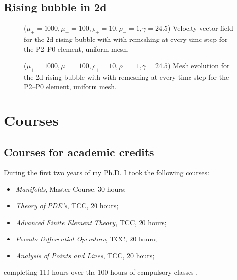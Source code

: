 \documentclass[a4paper,11pt,onecolumn]{article}
\begin{document}
\subsection{Rising bubble in 2d}

\begin{figure}[htbp]
\centering
{}
\caption{($\mu_+ = 1000,\mu_- = 100,\rho_+=10,\rho_-=1,\gamma = 24.5$)
Velocity vector field for the 2d rising bubble with with remeshing at every
time step for the P2--P0 element, uniform mesh.}
\label{fig:rising_bubble_2d_velocity}
\end{figure}

\begin{figure}[htbp]
\centering
{}
\caption{($\mu_+ = 1000,\mu_- = 100,\rho_+=10,\rho_-=1,\gamma = 24.5$)
Mesh evolution for the 2d rising bubble with with remeshing at every time step
for the P2--P0 element, uniform mesh.}
\label{fig:rising_bubble_2d}
\end{figure}

\section{Courses}

\subsection{Courses for academic credits}

During the first two years of my Ph.D. I took the following courses:
\begin{itemize}
\item \textit{Manifolds}, Master Course, 30 hours;
\item \textit{Theory of PDE's}, TCC, 20 hours;
\item \textit{Advanced Finite Element Theory}, TCC, 20 hours;
\item \textit{Pseudo Differential Operators}, TCC, 20 hours;
\item \textit{Analysis of Points and Lines}, TCC, 20 hours;
\end{itemize}
completing 110 hours over the 100 hours of compulsory classes .
\end{document}
